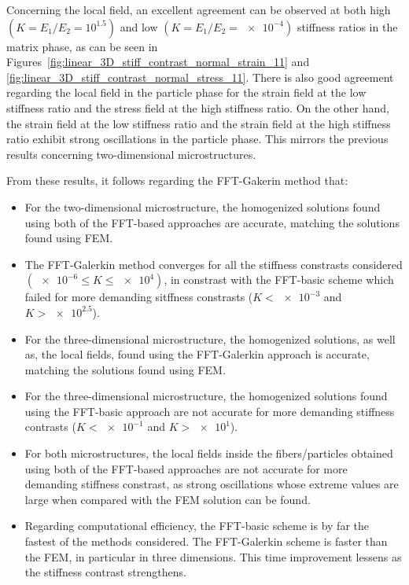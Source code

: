Concerning the local field, an excellent agreement can be observed at both high \((K=E_1/E_2=10^{1.5})\) and low \((K=E_1/E_2=\num{e-4})\) stiffness ratios in the matrix phase, as can be seen in Figures~\ref{fig:linear_3D_stiff_contrast_normal_strain_11} and \ref{fig:linear_3D_stiff_contrast_normal_stress_11}.
There is also good agreement regarding the local field in the particle phase for the strain field at the low stiffness ratio and the stress field at the high stiffness ratio.
On the other hand, the strain field at the low stiffness ratio and the strain field at the high stiffness ratio exhibit strong oscillations in the particle phase.
This mirrors the previous results concerning two-dimensional microstructures.

From these results, it follows regarding the FFT-Gakerin method that:
\begin{itemize}
  \item For the two-dimensional microstructure, the homogenized solutions found using both of the FFT-based approaches are accurate, matching the solutions found using FEM.
  \item The FFT-Galerkin method converges for all the stiffness constrasts considered \((\num{e-6} \leq K \leq \num{e4})\), in constrast with the FFT-basic scheme which failed for more demanding sitffness constrasts (\(K<\num{e-3}\) and \(K>\num{e2.5}\)).
  \item For the three-dimensional microstructure, the homogenized solutions, as well as, the local fields, found using the FFT-Galerkin approach is accurate, matching the solutions found using FEM.
  \item For the three-dimensional microstructure, the homogenized solutions found using the FFT-basic approach are not accurate for more demanding stiffness contrasts (\(K<\num{e-1}\) and \(K>\num{e1}\)).
  \item For both microstructures, the local fields inside the fibers/particles obtained using both of the FFT-based approaches are not accurate for more demanding stiffness constrast, as strong oscillations whose extreme values are large when compared with the FEM solution can be found.
  \item Regarding computational efficiency, the FFT-basic scheme is by far the fastest of the methods considered.
  The FFT-Galerkin scheme is faster than the FEM, in particular in three dimensions.
  This time improvement lessens as the stiffness contrast strengthens.
\end{itemize}

